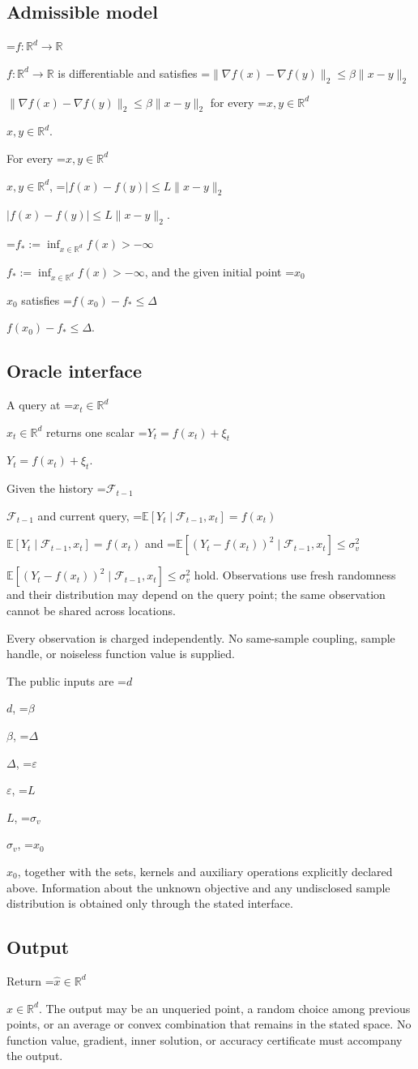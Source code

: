 \documentclass[10pt,a4paper]{article}
\newcommand{\AtlasMath}[1]{\par\begingroup\centering\setbox0=\hbox{$\displaystyle #1$}\ifdim\wd0>1.4\linewidth\typeout{ATLAS WIDE FORMULA: \the\wd0}\fi\ifdim\wd0>\linewidth\resizebox{\linewidth}{!}{\box0}\else\box0\fi\par\endgroup}
\newcommand{\AtlasInlineMath}[1]{\begingroup\setbox0=\hbox{$#1$}\ifdim\wd0>.4\linewidth\endgroup\AtlasMath{#1}\else\endgroup$#1$\fi}
\begin{document}
\subsection{Admissible model}
\AtlasInlineMath{f:\mathbb{R}^d\to\mathbb{R}} is differentiable and satisfies \AtlasInlineMath{\|\nabla f(x)-\nabla f(y)\|_2\le\beta\|x-y\|_2} for every \AtlasInlineMath{x,y\in\mathbb{R}^d}.

For every \AtlasInlineMath{x,y\in\mathbb{R}^d}, \AtlasInlineMath{|f(x)-f(y)|\le L\|x-y\|_2}.

\AtlasInlineMath{f_*:=\inf_{x\in\mathbb{R}^d}f(x)>-\infty}, and the given initial point \AtlasInlineMath{x_0} satisfies \AtlasInlineMath{f(x_0)-f_*\le\Delta}.

\subsection{Oracle interface}
A query at \AtlasInlineMath{x_t\in \mathbb{R}^d} returns one scalar \AtlasInlineMath{Y_t=f(x_t)+\xi_t}.

Given the history \AtlasInlineMath{\mathcal{F}_{t-1}} and current query, \AtlasInlineMath{\mathbb{E}[Y_t\mid\mathcal{F}_{t-1},x_t]=f(x_t)} and \AtlasInlineMath{\mathbb{E}[(Y_t-f(x_t))^2\mid\mathcal{F}_{t-1},x_t]\le\sigma_v^2} hold. Observations use fresh randomness and their distribution may depend on the query point; the same observation cannot be shared across locations.

Every observation is charged independently. No same-sample coupling, sample handle, or noiseless function value is supplied.

The public inputs are \AtlasInlineMath{d}, \AtlasInlineMath{\beta}, \AtlasInlineMath{\Delta}, \AtlasInlineMath{\varepsilon}, \AtlasInlineMath{L}, \AtlasInlineMath{\sigma_v}, \AtlasInlineMath{x_0}, together with the sets, kernels and auxiliary operations explicitly declared above. Information about the unknown objective and any undisclosed sample distribution is obtained only through the stated interface.

\subsection{Output}
Return \AtlasInlineMath{\widehat{x}\in \mathbb{R}^d}. The output may be an unqueried point, a random choice among previous points, or an average or convex combination that remains in the stated space. No function value, gradient, inner solution, or accuracy certificate must accompany the output.
\end{document}
